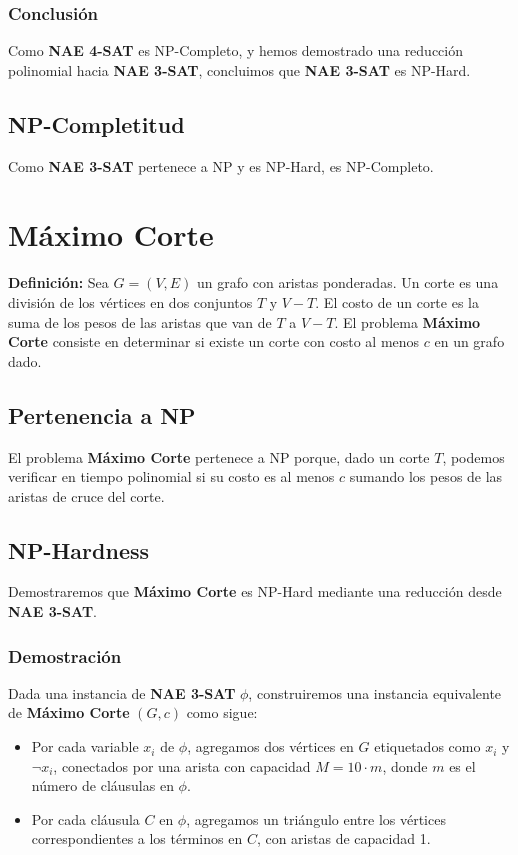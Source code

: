 \documentclass[a4paper,12pt]{article}
\begin{document}
\subsubsection{Conclusi\'on}
Como \textbf{NAE 4-SAT} es NP-Completo, y hemos demostrado una reducci\'on polinomial hacia \textbf{NAE 3-SAT}, concluimos que \textbf{NAE 3-SAT} es NP-Hard. 

\subsection{NP-Completitud}
Como \textbf{NAE 3-SAT} pertenece a NP y es NP-Hard, es NP-Completo.

\section{Máximo Corte}

\textbf{Definici\'on:} Sea $G = (V, E)$ un grafo con aristas ponderadas. Un corte es una divisi\'on de los v\'ertices en dos conjuntos $T$ y $V - T$. El costo de un corte es la suma de los pesos de las aristas que van de $T$ a $V - T$. El problema \textbf{Máximo Corte} consiste en determinar si existe un corte con costo al menos $c$ en un grafo dado.

\subsection{Pertenencia a NP}

El problema \textbf{Máximo Corte} pertenece a NP porque, dado un corte $T$, podemos verificar en tiempo polinomial si su costo es al menos $c$ sumando los pesos de las aristas de cruce del corte.

\subsection{NP-Hardness}

Demostraremos que \textbf{Máximo Corte} es NP-Hard mediante una reducci\'on desde \textbf{NAE 3-SAT}.

\subsubsection{Demostraci\'on}
Dada una instancia de \textbf{NAE 3-SAT} $\phi$, construiremos una instancia equivalente de \textbf{Máximo Corte} $(G, c)$ como sigue:
\begin{itemize}
    \item Por cada variable $x_i$ de $\phi$, agregamos dos v\'ertices en $G$ etiquetados como $x_i$ y $\neg x_i$, conectados por una arista con capacidad $M = 10 \cdot m$, donde $m$ es el n\'umero de cl\'ausulas en $\phi$.
    \item Por cada cl\'ausula $C$ en $\phi$, agregamos un tri\'angulo entre los v\'ertices correspondientes a los t\'erminos en $C$, con aristas de capacidad 1.
\end{itemize}
\end{document}
